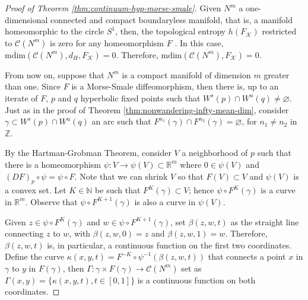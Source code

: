 \documentclass[sn-mathphys-num]{sn-jnl}%
\theoremstyle{thmstyleone}%
\theoremstyle{thmstyletwo}%
\theoremstyle{thmstylethree}%
\newcommand*\induce[1]{#1_\mathcal{K}}
\newcommand*\hyp[1]{\mathcal{#1}}
\begin{document}
\begin{proof}[Proof of Theorem \emph{\ref{thm:continuum-hyp-morse-smale}}]
    Given $N^m$ a one-dimensional connected and compact boundaryless manifold, that is, a manifold homeomorphic to the circle $S^1$, then, the topological entropy $h(\induce{F})$ restricted to $\hyp{C}(N^m)$ is zero for any homeomorphism $F$ \cite[Theorem 1 \& 4]{lampart_raith_2010}. In this case, $\overline{\text{mdim}}(\hyp{C}(N^m), d_H, \induce{F}) = 0$. Therefore, $\text{mdim}(\hyp{C}(N^m), \induce{F}) = 0$.

    From now on, suppose that $N^m$ is a compact manifold of dimension $m$ greater than one. Since $F$ is a Morse-Smale diffeomorphism, then there is, up to an iterate of $F$, $p$ and $q$ hyperbolic fixed points such that $W^s(p) \cap W^u(q) \neq \varnothing$. Just as in the proof of Theorem \ref{thm:nonwandering-infty-mean-dim}, consider $\gamma \subset W^s(p) \cap W^u(q)$ an arc such that $F^{n_1}(\gamma) \cap F^{n_2}(\gamma) = \varnothing$, for $n_1 \neq n_2$ in $\mathbb{Z}$.

    By the Hartman-Grobman Theorem, consider $V$ a neighborhood of $p$ such that there is a homeomorphism $\psi: V \to \psi(V) \subset \mathbb{R}^m$ where $0 \in \psi(V)$ and $(DF)_p\circ\psi = \psi\circ F$. Note that we can shrink $V$ so that $F(V) \subset V$ and $\psi(V)$ is a convex set. Let $K \in \mathbb{N}$ be such that $F^K(\gamma) \subset V$; hence $\psi\circ F^K(\gamma)$ is a curve in $\mathbb{R}^m$. Observe that $\psi\circ F^{K + 1}(\gamma)$ is also a curve in $\psi(V)$.

    Given $z \in \psi\circ F^K(\gamma)$ and $w \in \psi\circ F^{K + 1}(\gamma)$, set $\beta(z, w, t)$ as the straight line connecting $z$ to $w$, with $\beta(z, w, 0) = z$ and $\beta(z, w, 1) = w$. Therefore, $\beta(z, w, t)$ is, in particular, a continuous function on the first two coordinates. Define the curve $\kappa(x, y, t) = F^{-K}\circ \psi^{-1}(\beta(z, w, t))$ that connects a point $x$ in $\gamma$ to $y$ in $F(\gamma)$, then $\Gamma:\gamma\times F(\gamma) \to \hyp{C}(N^m)$ set as $\Gamma(x, y) = \{\kappa(x, y, t), t \in [0, 1]\}$ is a continuous function on both coordinates.


\end{proof}
\end{document}
